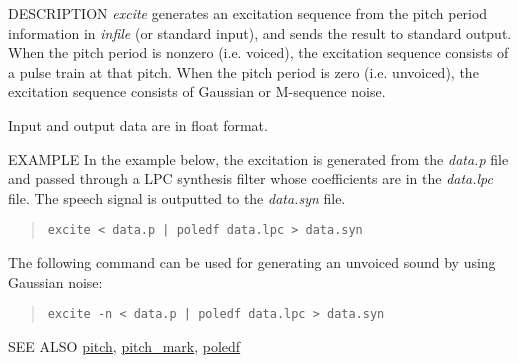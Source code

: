 \begin{synopsis}
\item [excite] [ --p $P$ ] [ --i $I$ ] [ --n ] [ --s $S$ ] [ {\em infile} ]
\end{synopsis}

\begin{qsection}{DESCRIPTION}
{\em excite} generates an excitation sequence 
from the pitch period information in {\em infile} (or standard input), 
and sends the result to standard output. 
When the pitch period is nonzero (i.e. voiced), 
the excitation sequence consists of a pulse train at that pitch. 
When the pitch period is zero (i.e. unvoiced),
the excitation sequence consists of Gaussian or M-sequence noise.

Input and output data are in float format.
\end{qsection}

\begin{options}
\end{options}

\begin{qsection}{EXAMPLE}
In the example below, the excitation is generated from the
{\em data.p} file and passed through a LPC synthesis filter
whose coefficients are in the {\em data.lpc} file.
The speech signal is outputted to the {\em data.syn} file.
\begin{quote}
 \verb!excite < data.p | poledf data.lpc > data.syn!
\end{quote} 
The following command can be used for generating an unvoiced sound by
using Gaussian noise:
\begin{quote}
 \verb!excite -n < data.p | poledf data.lpc > data.syn!
\end{quote}
\end{qsection}

\begin{qsection}{SEE ALSO}
\hyperlink{pitch}{pitch},
\hyperlink{pitch\_mark}{pitch\_mark},
\hyperlink{poledf}{poledf}
\end{qsection}
